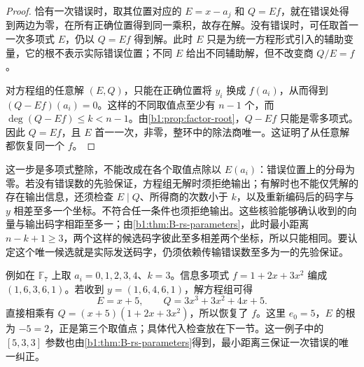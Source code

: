 \begin{proof}
	恰有一次错误时，取其位置对应的 \(E=x-a_j\) 和 \(Q=Ef\)，就在错误处得到两边为零，在所有正确位置得到同一乘积，故存在解。没有错误时，可任取首一一次多项式 \(E\)，仍以 \(Q=Ef\) 得到解。此时 \(E\) 只是为统一方程形式引入的辅助变量，它的根不表示实际错误位置；不同 \(E\) 给出不同辅助解，但不改变商 \(Q/E=f\)。

	对方程组的任意解 \((E,Q)\)，只能在正确位置将 \(y_i\) 换成 \(f(a_i)\)，从而得到 \((Q-Ef)(a_i)=0\)。这样的不同取值点至少有 \(n-1\) 个，而 \(\deg(Q-Ef)\leq k<n-1\)。由\cref{b1:prop:factor-root}，\(Q-Ef\) 只能是零多项式。因此 \(Q=Ef\)，且 \(E\) 首一一次，非零，整环中的除法商唯一。这证明了从任意解都恢复同一个 \(f\)。
\end{proof}

这一步是多项式整除，不能改成在各个取值点除以 \(E(a_i)\)：错误位置上的分母为零。若没有错误数的先验保证，方程组无解时须拒绝输出；有解时也不能仅凭解的存在输出信息，还须检查 \(E\mid Q\)、所得商的次数小于 \(k\)，以及重新编码后的码字与 \(y\) 相差至多一个坐标。不符合任一条件也须拒绝输出。这些核验能够确认收到的向量与输出码字相距至多一；由\cref{b1:thm:B-rs-parameters}，此时最小距离 \(n-k+1\geq3\)，两个这样的候选码字彼此至多相差两个坐标，所以只能相同。要认定这个唯一候选就是实际发送码字，仍须依赖传输错误数至多为一的先验保证。

\ProseParagraphBreak
例如在 \(\mathbb F_7\) 上取 \(a_i=0,1,2,3,4\)、\(k=3\)。信息多项式 \(f=1+2x+3x^2\) 编成 \((1,6,3,6,1)\)。若收到 \(y=(1,6,4,6,1)\)，解方程组可得
\[
	E=x+5,\qquad Q=3x^3+3x^2+4x+5.
\]
直接相乘有 \(Q=(x+5)(1+2x+3x^2)\)，所以恢复了 \(f\)。这里 \(e_0=5\)，\(E\) 的根为 \(-5=2\)，正是第三个取值点；具体代入检查放在下一节。这一例子中的 \([5,3,3]\) 参数也由\cref{b1:thm:B-rs-parameters}得到，最小距离三保证一次错误的唯一纠正。
